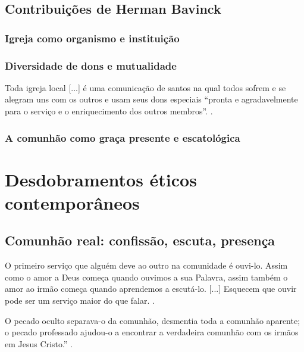 \subsection{Contribuições de Herman Bavinck}

\subsubsection{Igreja como organismo e instituição}

\subsubsection{Diversidade de dons e mutualidade}
\begin{citacao}
Toda igreja local [...] é uma comunicação de santos na qual todos sofrem e se alegram uns com os outros e usam seus dons especiais ``pronta e agradavelmente para o serviço e o enriquecimento dos outros membros''. \cite[p. 380]{bavinck2012}.
\end{citacao}

\subsubsection{A comunhão como graça presente e escatológica}

\section{Desdobramentos éticos contemporâneos}

\subsection{Comunhão real: confissão, escuta, presença}
\begin{citacao}
O primeiro serviço que alguém deve ao outro na comunidade é ouvi-lo. Assim como o amor a Deus começa quando ouvimos a sua Palavra, assim também o amor ao irmão começa quando aprendemos a escutá-lo. [...] Esquecem que ouvir pode ser um serviço maior do que falar. \cite[pp. 75--76]{bonhoeffer1997}.
\end{citacao}

\begin{citacao}O pecado oculto separava-o da comunhão, desmentia toda a comunhão aparente; o pecado professado ajudou-o a encontrar a verdadeira comunhão com os irmãos em Jesus Cristo.'' \cite[p. 80]{bonhoeffer1997}.
\end{citacao}

